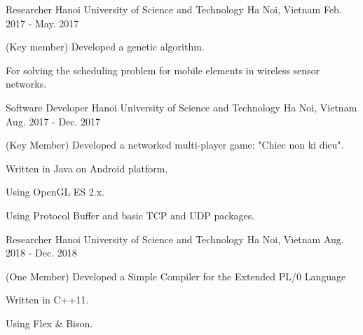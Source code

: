


\begin{cventries}


\cventry
{Researcher} %
{Hanoi University of Science and Technology} %
{Ha Noi, Vietnam} %
{Feb. 2017 - May. 2017} %
{ %
\begin{cvitems}
\item{(Key member) Developed a genetic algorithm.}
\item{For solving the scheduling problem for mobile elements in wireless sensor networks.}
\end{cvitems}
}


\cventry
{Software Developer} %
{Hanoi University of Science and Technology} %
{Ha Noi, Vietnam} %
{Aug. 2017 - Dec. 2017} %
{ %
\begin{cvitems}
\item{(Key Member) Developed a networked multi-player game: "Chiec non ki dieu".}
\item{Written in Java on Android platform.}
\item{Using OpenGL ES 2.x.}
\item{Using Protocol Buffer and basic TCP and UDP packages.}
\end{cvitems}
}


\cventry
{Researcher} %
{Hanoi University of Science and Technology} %
{Ha Noi, Vietnam} %
{Aug. 2018 - Dec. 2018} %
{ %
\begin{cvitems}
\item{(One Member) Developed a Simple Compiler for the Extended PL/0 Language}
\item{Written in C++11.}
\item{Using Flex \& Bison.}
\end{cvitems}
}


\end{cventries}
